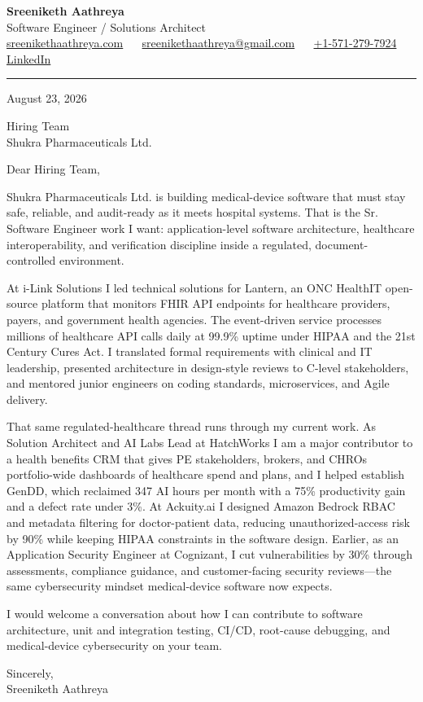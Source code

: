 \documentclass[11pt, letterpaper]{article}
\begin{document}
{\fontsize{18 pt}{20 pt}\selectfont\bfseries Sreeniketh Aathreya}\\[4pt]
Software Engineer / Solutions Architect\\[6pt]
\href{https://sreenikethaathreya.com}{sreenikethaathreya.com}
~\textbullet~
\href{mailto:sreenikethaathreya@gmail.com}{sreenikethaathreya@gmail.com}
~\textbullet~
\href{tel:+1-571-279-7924}{+1-571-279-7924}
~\textbullet~
\href{https://www.linkedin.com/in/sreeniketh-aathreya-16800b122/}{LinkedIn}

\vspace{12pt}
\hrule
\vspace{12pt}

August 23, 2026

\vspace{8pt}

Hiring Team\\
Shukra Pharmaceuticals Ltd.

\vspace{12pt}

Dear Hiring Team,

Shukra Pharmaceuticals Ltd. is building medical-device software that must stay safe, reliable, and audit-ready as it meets hospital systems. That is the Sr. Software Engineer work I want: application-level software architecture, healthcare interoperability, and verification discipline inside a regulated, document-controlled environment.

At i-Link Solutions I led technical solutions for Lantern, an ONC HealthIT open-source platform that monitors FHIR API endpoints for healthcare providers, payers, and government health agencies. The event-driven service processes millions of healthcare API calls daily at 99.9\% uptime under HIPAA and the 21st Century Cures Act. I translated formal requirements with clinical and IT leadership, presented architecture in design-style reviews to C-level stakeholders, and mentored junior engineers on coding standards, microservices, and Agile delivery.

That same regulated-healthcare thread runs through my current work. As Solution Architect and AI Labs Lead at HatchWorks I am a major contributor to a health benefits CRM that gives PE stakeholders, brokers, and CHROs portfolio-wide dashboards of healthcare spend and plans, and I helped establish GenDD, which reclaimed 347 AI hours per month with a 75\% productivity gain and a defect rate under 3\%. At Ackuity.ai I designed Amazon Bedrock RBAC and metadata filtering for doctor-patient data, reducing unauthorized-access risk by 90\% while keeping HIPAA constraints in the software design. Earlier, as an Application Security Engineer at Cognizant, I cut vulnerabilities by 30\% through assessments, compliance guidance, and customer-facing security reviews---the same cybersecurity mindset medical-device software now expects.

I would welcome a conversation about how I can contribute to software architecture, unit and integration testing, CI/CD, root-cause debugging, and medical-device cybersecurity on your team.

Sincerely,\\[12pt]
Sreeniketh Aathreya
\end{document}
